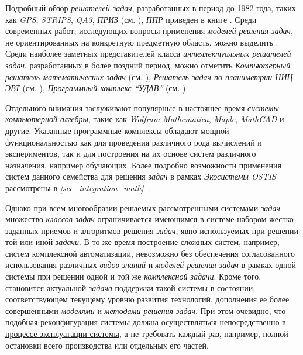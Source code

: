 Подробный обзор \textit{решателей задач}, разработанных в период до 1982 года, таких как \textit{GPS}, \textit{STRIPS}, \textit{QA3}, \textit{ПРИЗ} (см. ), \textit{ППР} приведен в книге . Среди современных работ, исследующих вопросы применения \textit{моделей решения задач}, не ориентированных на конкретную предметную область, можно выделить . Среди наиболее заметных представителей класса \textit{интеллектуальных решателей задач}, разработанных в более поздний период, можно отметить \textit{Компьютерный решатель математических задач} (см. ), \textit{Решатель задач по планиметрии НИЦ ЭВТ} (см. ), \textit{Программный комплекс ``УДАВ''} (см. ). 

Отдельного внимания заслуживают популярные в настоящее время \textit{системы компьютерной алгебры}, такие как \textit{Wolfram Mathematica}, \textit{Maple}, \textit{MathCAD} и другие. Указанные программные комплексы обладают мощной функциональностью как для проведения различного рода вычислений и экспериментов, так и для построения на их основе систем различного назначения, например обучающих. Более подробно возможности применения систем данного семейства для решения \textit{задач} в рамках \textit{Экосистемы OSTIS} рассмотрены в \textit{\ref{sec_integration_math}~}.

Однако при всем многообразии решаемых рассмотренными системами \textit{задач} множество \textit{классов задач} ограничивается имеющимся в системе набором жестко заданных приемов и алгоритмов решения \textit{задач}, явно используемых при решении той или иной \textit{задачи}. В то же время построение сложных систем, например, систем комплексной автоматизации, невозможно без обеспечения согласованного использования различных \textit{видов знаний} и \textit{моделей решения задач} в рамках одной системы при решении одной и той же \textit{комплексной задачи}. Кроме того, становится актуальной \textit{задача} поддержки такой системы в состоянии, соответствующем текущему уровню развития технологий, дополнения ее более совершенными \textit{моделями} и \textit{методами решения задач}. При этом очевидно, что подобная реконфигурация системы должна осуществляться \underline{непосредственно в процессе эксплуатации системы}, а не требовать каждый раз, например, полной остановки всего производства или отдельных его частей.

